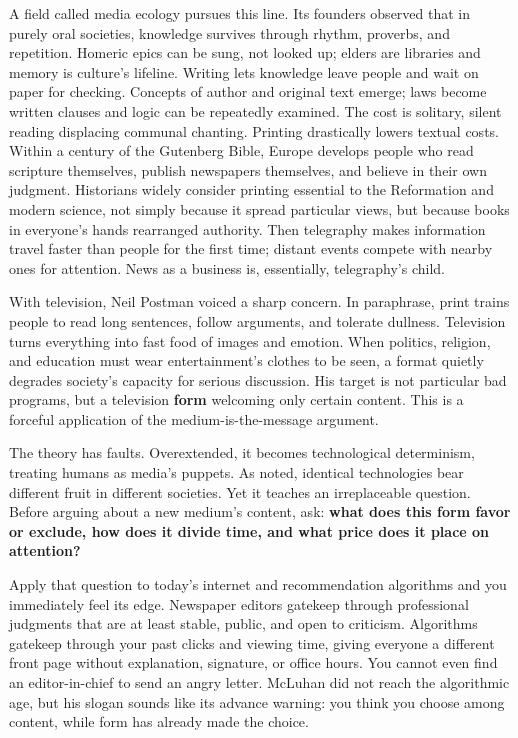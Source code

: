 A field called media ecology pursues this line. Its founders observed that in purely oral societies, knowledge survives through rhythm, proverbs, and repetition. Homeric epics can be sung, not looked up; elders are libraries and memory is culture's lifeline. Writing lets knowledge leave people and wait on paper for checking. Concepts of author and original text emerge; laws become written clauses and logic can be repeatedly examined. The cost is solitary, silent reading displacing communal chanting. Printing drastically lowers textual costs. Within a century of the Gutenberg Bible, Europe develops people who read scripture themselves, publish newspapers themselves, and believe in their own judgment. Historians widely consider printing essential to the Reformation and modern science, not simply because it spread particular views, but because books in everyone's hands rearranged authority. Then telegraphy makes information travel faster than people for the first time; distant events compete with nearby ones for attention. News as a business is, essentially, telegraphy's child.

With television, Neil Postman voiced a sharp concern. In paraphrase, print trains people to read long sentences, follow arguments, and tolerate dullness. Television turns everything into fast food of images and emotion. When politics, religion, and education must wear entertainment's clothes to be seen, a format quietly degrades society's capacity for serious discussion. His target is not particular bad programs, but a television \textbf{form} welcoming only certain content. This is a forceful application of the medium-is-the-message argument.

The theory has faults. Overextended, it becomes technological determinism, treating humans as media's puppets. As noted, identical technologies bear different fruit in different societies. Yet it teaches an irreplaceable question. Before arguing about a new medium's content, ask: \textbf{what does this form favor or exclude, how does it divide time, and what price does it place on attention?}

Apply that question to today's internet and recommendation algorithms and you immediately feel its edge. Newspaper editors gatekeep through professional judgments that are at least stable, public, and open to criticism. Algorithms gatekeep through your past clicks and viewing time, giving everyone a different front page without explanation, signature, or office hours. You cannot even find an editor-in-chief to send an angry letter. McLuhan did not reach the algorithmic age, but his slogan sounds like its advance warning: you think you choose among content, while form has already made the choice.

